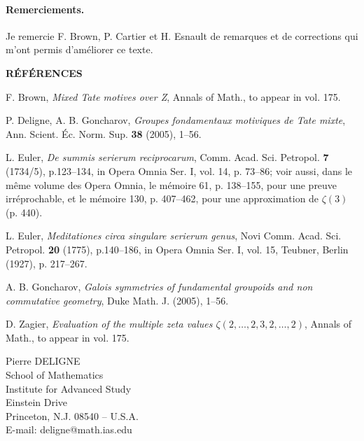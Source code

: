 \documentclass[10pt]{article}
\begin{document}
\paragraph{Remerciements.}
Je remercie F. Brown, P. Cartier et H. Esnault de remarques et de corrections qui m'ont permis d'améliorer ce texte.

\begin{center}\bfseries RÉFÉRENCES\end{center}
\begin{enumerate}[label={[\arabic*]},leftmargin=2.4em]
\item F. Brown, \emph{Mixed Tate motives over Z}, Annals of Math., to appear in vol. 175.
\item P. Deligne, A. B. Goncharov, \emph{Groupes fondamentaux motiviques de Tate mixte}, Ann. Scient. Éc. Norm. Sup. \textbf{38} (2005), 1--56.
\item L. Euler, \emph{De summis serierum reciprocarum}, Comm. Acad. Sci. Petropol. \textbf{7} (1734/5), p.123--134, in Opera Omnia Ser. I, vol. 14, p. 73--86; voir aussi, dans le même volume des Opera Omnia, le mémoire 61, p. 138--155, pour une preuve irréprochable, et le mémoire 130, p. 407--462, pour une approximation de $\zeta(3)$ (p. 440).
\item L. Euler, \emph{Meditationes circa singulare serierum genus}, Novi Comm. Acad. Sci. Petropol. \textbf{20} (1775), p.140--186, in Opera Omnia Ser. I, vol. 15, Teubner, Berlin (1927), p. 217--267.
\item A. B. Goncharov, \emph{Galois symmetries of fundamental groupoids and non commutative geometry}, Duke Math. J. (2005), 1--56.
\item D. Zagier, \emph{Evaluation of the multiple zeta values $\zeta(2,\ldots,2,3,2,\ldots,2)$}, Annals of Math., to appear in vol. 175.
\end{enumerate}

\begin{flushright}
Pierre DELIGNE\\
School of Mathematics\\
Institute for Advanced Study\\
Einstein Drive\\
Princeton, N.J. 08540 -- U.S.A.\\
E-mail: deligne@math.ias.edu
\end{flushright}
\end{document}
